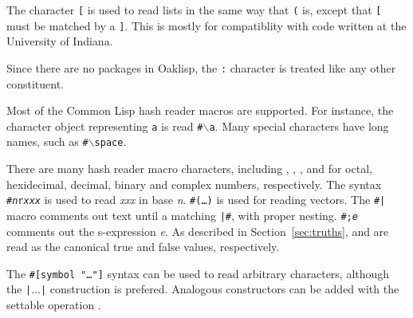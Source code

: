 
The character \texttt{[} is used to read lists in the same way that
\texttt{(} is, except that \texttt{[} must be matched by a \texttt{]}.
This is mostly for compatiblity with code written at the University of
Indiana.

Since there are no packages in Oaklisp, the \texttt{:} character is
treated like any other constituent.

Most of the Common Lisp hash reader macros are supported.  For
instance, the character object representing \texttt{a} is read
\texttt{\#$\backslash$a}.  Many special characters have long names, such as
\texttt{\#$\backslash$space}.


There are many hash reader macro characters, including ,
, ,  and  for octal, hexidecimal,
decimal, binary and complex numbers, respectively.  The syntax
\texttt{\#\emph{n}r\emph{xxx}} is used to read \emph{xxx} in base \emph{n}.
\texttt{\#(\ldots)} is used for reading vectors.  The \texttt{\#|} macro
comments out text until a matching \texttt{|\#}, with proper nesting.
\texttt{\#;\emph{e}} comments out the s-expression \emph{e}. As
described in Section~\ref{sec:truths},  and  are read
as the canonical true and false values, respectively.

The \texttt{\#[symbol "\ldots"]} syntax can be used to read arbitrary
characters, although the \texttt{|$\ldots$|} construction is prefered.
Analogous constructors can be added with the settable operation
.




